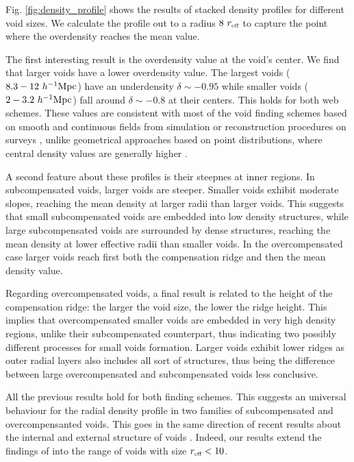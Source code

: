 \documentclass[a4,useAMS,usenatbib,usegraphicx]{mn2e}
\newcommand{\hMpc}{{\ifmmode{h^{-1}{\rm Mpc}}\else{$h^{-1}$Mpc}\fi}}
\newcommand{\reff}{{\ifmmode{r_{\mbox{\tiny eff}}}\else{$r_{\mbox{\tiny eff}}$}\fi}}
\begin{document}
Fig. \ref{fig:density_profile} shows the results of stacked density
profiles for different void sizes.  
We calculate the profile out to a radius $8\ \reff$  to capture the
point where the overdensity reaches the mean value.


The first interesting result is the overdensity value at the void's
center.
We find that larger voids have a lower overdensity value.
The largest voids ($8.3-12\ \hMpc$) have an underdensity
$\delta \sim-0.95$ while smaller voids  ($2-3.2\ \hMpc$) fall around $\delta\sim 
-0.8$ at their centers.
This holds for both web schemes. 
These values are consistent with most of the void finding schemes
based on smooth and continuous fields from simulation or
reconstruction procedures on surveys \citep{Plionis02, Colberg05,
  Shandarin06,  Platen07, Neyrinck08, MunozCuartas11, Ceccarelli13,
  Paz13, Neyrinck13, Ricciardelli2013}, unlike geometrical approaches based 
on point distributions, where central density values are generally higher
\citep{Colberg08}. 


A second feature about these profiles is their steepnes at inner
regions.  
In subcompensated voids, larger voids are steeper.
Smaller voids exhibit moderate slopes, reaching the mean density at
larger radii than larger voids.
This suggests that small subcompensated voids are embedded into low
density structures, while large subcompensated voids are surrounded
by dense structures, reaching the mean density at lower effective
radii than smaller voids. 
In the overcompensated case larger voids reach first  both the
compensation ridge and then the mean density value.  


Regarding overcompensated voids, a final result is related to the height 
of the compensation ridge: the larger the void size, the lower the ridge
height. This implies that overcompensated smaller voids are embedded in 
very high density regions, unlike their subcompensated counterpart, thus 
indicating two possibly different processes for small voids formation. 
Larger voids exhibit lower ridges as outer radial layers also includes all
sort of structures, thus being the difference between large overcompensated
and subcompensated voids less conclusive.

All the previous results hold for both finding schemes.
This suggests an universal behaviour for the radial density profile in
two families of subcompensated and overcompensanted voids. 
This goes in the same direction of recent results about the internal
\citep{Colberg05,  Ricciardelli2013} and external structure of voids
\citep{Lavaux12, Ceccarelli13, Paz13, Hamaus14}. 
Indeed, our results extend the findings of \cite{Hamaus14} into the
range of voids with size $\reff <10$\hMpc.  
 
\end{document}
